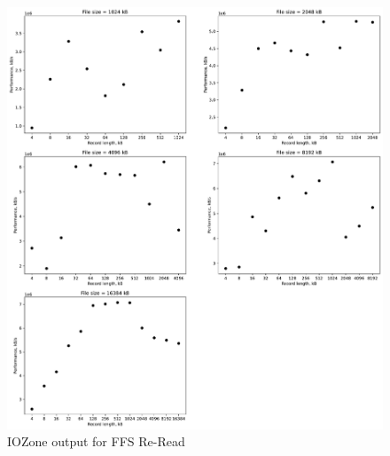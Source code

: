 \begin{figure}[!htb]
	\label{fig:app_bench_ffs_re_read}
	\begin{center}
		\includegraphics[width=1.0\textwidth]{figures/benchmarking/ffs/Re-Read.pdf}
	\end{center}
	\caption{IOZone output for \gls{FFS} Re-Read}
\end{figure}

